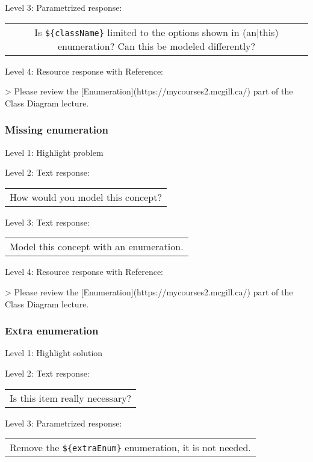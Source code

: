 \noindent Level 3: Parametrized response: \medskip

\begin{tabular}{|c}
Is \verb|${className}| limited to the options shown in (an|this) enumeration? Can this be modeled differently?
\end{tabular} \medskip

\noindent Level 4: Resource response with Reference:

> Please review the [Enumeration](https://mycourses2.mcgill.ca/) part of the Class Diagram lecture.


\subsubsection{Missing enumeration}

\noindent Level 1: Highlight problem \medskip

\noindent Level 2: Text response: \medskip

\begin{tabular}{|c}
How would you model this concept?
\end{tabular} \medskip

\noindent Level 3: Text response: \medskip

\begin{tabular}{|c}
Model this concept with an enumeration.
\end{tabular} \medskip

\noindent Level 4: Resource response with Reference:

> Please review the [Enumeration](https://mycourses2.mcgill.ca/) part of the Class Diagram lecture.


\subsubsection{Extra enumeration}

\noindent Level 1: Highlight solution \medskip

\noindent Level 2: Text response: \medskip

\begin{tabular}{|c}
Is this item really necessary?
\end{tabular} \medskip

\noindent Level 3: Parametrized response: \medskip

\begin{tabular}{|c}
Remove the \verb|${extraEnum}| enumeration, it is not needed.
\end{tabular} \medskip

